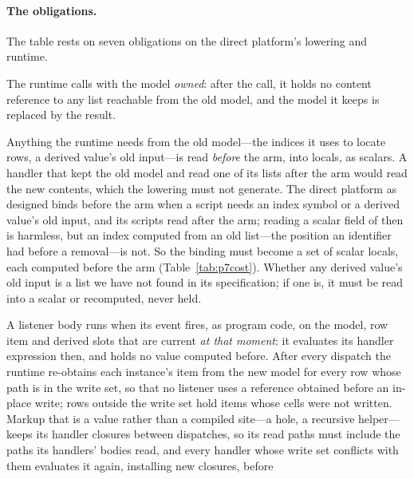 \paragraph{The obligations.} The table rests on seven obligations on the direct platform's lowering and
runtime.
\begin{description}[leftmargin=1.2em,font=\normalfont\itshape]
\item[\Obl{P1}, hand-over.] The runtime calls  with the model \emph{owned}: after the call,
it holds no content reference to any list reachable from the old model, and the model it keeps is
replaced by the result.
\item[\Obl{P2}, reads before the arm are the handler's.] Anything the runtime needs from the old
model---the indices it uses to locate rows, a derived value's old input---is read \emph{before} the arm,
into locals, as scalars. A handler that kept the old model and read one of its lists after the arm would
read the new contents, which the lowering must not generate. The direct platform as designed binds
 before the arm when a script needs an index symbol or a derived value's old
input, and its scripts read  after the arm; reading a scalar field of  then is
harmless, but an index computed from an old list---the position an identifier had before a removal---is
not. So the binding must become a set of scalar locals, each computed before the arm (Table~\ref{tab:p7cost}).
Whether any derived value's old input is a list we have not found in its specification; if one is, it must
be read into a scalar or recomputed, never held.
\item[\Obl{P3}, nothing made by an earlier evaluation of the view is used after a conflicting dispatch.]
A listener body runs when its event fires, as program code, on the model, row item and derived slots
that are current \emph{at that moment}: it evaluates its handler expression then, and holds no value
computed before. After every dispatch the runtime re-obtains each instance's item from the new model for
every row whose path is in the write set, so that no listener uses a reference obtained before an
in-place write; rows outside the write set hold items whose cells were not written. Markup that is a
value rather than a compiled site---a  hole, a recursive helper---keeps its handler
closures between dispatches, so its read paths must include the paths its handlers' bodies read, and
every handler whose write set conflicts with them evaluates it again, installing new closures, before

\end{description}
